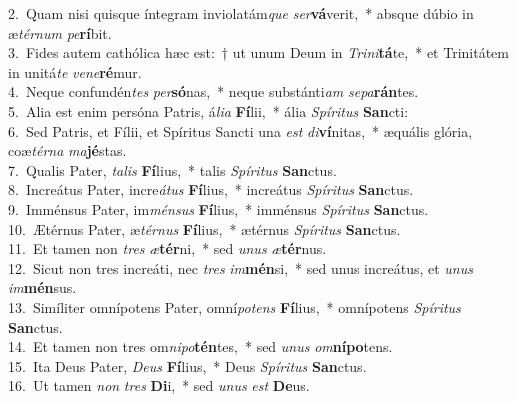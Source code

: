 {2.~}Quam nisi quisque íntegram inviolatám\textit{que} \textit{ser}\textbf{vá}verit,~* absque dúbio in æ\textit{tér}\textit{num} \textit{pe}\textbf{rí}bit.\\
{3.~}Fides autem cathólica hæc est:~† ut unum Deum in \textit{Tri}\textit{ni}\textbf{tá}te,~* et Trinitátem in unitá\textit{te} \textit{ve}\textit{ne}\textbf{ré}mur.\\
{4.~}Neque confundén\textit{tes} \textit{per}\textbf{só}nas,~* neque substánti\textit{am} \textit{se}\textit{pa}\textbf{rán}tes.\\
{5.~}Alia est enim persóna Patris, á\textit{li}\textit{a} \textbf{Fí}lii,~* ália \textit{Spí}\textit{ri}\textit{tus} \textbf{San}cti:\\
{6.~}Sed Patris, et Fílii, et Spíritus Sancti una \textit{est} \textit{di}\textbf{ví}nitas,~* æquális glória, coæ\textit{tér}\textit{na} \textit{ma}\textbf{jé}stas.\\
{7.~}Qualis Pater, \textit{ta}\textit{lis} \textbf{Fí}lius,~* talis \textit{Spí}\textit{ri}\textit{tus} \textbf{San}ctus.\\
{8.~}Increátus Pater, incre\textit{á}\textit{tus} \textbf{Fí}lius,~* increátus \textit{Spí}\textit{ri}\textit{tus} \textbf{San}ctus.\\
{9.~}Imménsus Pater, im\textit{mén}\textit{sus} \textbf{Fí}lius,~* imménsus \textit{Spí}\textit{ri}\textit{tus} \textbf{San}ctus.\\
{10.~}Ætérnus Pater, æ\textit{tér}\textit{nus} \textbf{Fí}lius,~* ætérnus \textit{Spí}\textit{ri}\textit{tus} \textbf{San}ctus.\\
{11.~}Et tamen non \textit{tres} \textit{æ}\textbf{tér}ni,~* sed \textit{u}\textit{nus} \textit{æ}\textbf{tér}nus.\\
{12.~}Sicut non tres increáti, nec \textit{tres} \textit{im}\textbf{mén}si,~* sed unus increátus, et \textit{u}\textit{nus} \textit{im}\textbf{mén}sus.\\
{13.~}Simíliter omnípotens Pater, omní\textit{po}\textit{tens} \textbf{Fí}lius,~* omnípotens \textit{Spí}\textit{ri}\textit{tus} \textbf{San}ctus.\\
{14.~}Et tamen non tres om\textit{ni}\textit{po}\textbf{tén}tes,~* sed \textit{u}\textit{nus} \textit{om}\textbf{ní}\textbf{po}tens.\\
{15.~}Ita Deus Pater, \textit{De}\textit{us} \textbf{Fí}lius,~* Deus \textit{Spí}\textit{ri}\textit{tus} \textbf{San}ctus.\\
{16.~}Ut tamen \textit{non} \textit{tres} \textbf{Di}i,~* sed \textit{u}\textit{nus} \textit{est} \textbf{De}us.\\
